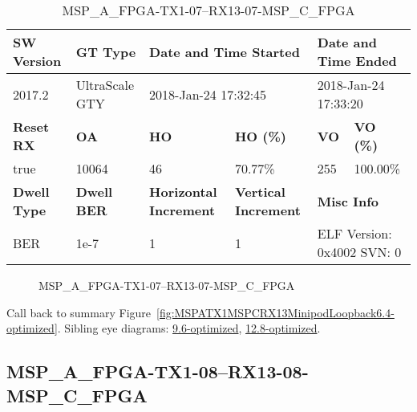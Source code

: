\begin{table}[h]
\centering
\caption{MSP\_A\_FPGA-TX1-07--RX13-07-MSP\_C\_FPGA}
\label{tab:MSPAFPGATX107RX1307MSPCFPGA6.4-optimized}
\begin{tabular}{@{}|l|l|l|l|l|l|@{}}
\toprule
\textbf{SW Version}                & \textbf{GT Type}   & \multicolumn{2}{l|}{\textbf{Date and Time Started}}            & \multicolumn{2}{l|}{\textbf{Date and Time Ended}}        \\ \midrule
2017.2                       & UltraScale GTY          & \multicolumn{2}{l|}{2018-Jan-24 17:32:45}                   & \multicolumn{2}{l|}{2018-Jan-24 17:33:20}               \\ \midrule
\textbf{Reset RX}                  & \textbf{OA} & \textbf{HO}   & \textbf{HO (\%)} & \textbf{VO} & \textbf{VO (\%)} \\ \midrule
true & 10064        & 46          & 70.77\%        & 255        & 100.00\%       \\ \midrule
\textbf{Dwell Type}                & \textbf{Dwell BER} & \textbf{Horizontal Increment} & \textbf{Vertical Increment}    & \multicolumn{2}{l|}{\textbf{Misc Info}}                  \\ \midrule
BER                            & 1e-7        & 1        & 1           & \multicolumn{2}{l|}{ELF Version: 0x4002 SVN: 0}                         \\ \bottomrule
\end{tabular}
\end{table}

\begin{figure}[h]
\caption{MSP\_A\_FPGA-TX1-07--RX13-07-MSP\_C\_FPGA} \label{fig:MSPAFPGATX107RX1307MSPCFPGA6.4-optimized}
\end{figure}

Call back to summary Figure~\ref{fig:MSPATX1MSPCRX13MinipodLoopback6.4-optimized}.
Sibling eye diagrams: \hyperref[sec:MSPAFPGATX107RX1307MSPCFPGA9.6-optimized]{9.6-optimized}, \hyperref[sec:MSPAFPGATX107RX1307MSPCFPGA12.8-optimized]{12.8-optimized}.

\clearpage
\newpage


\subsection{MSP\_A\_FPGA-TX1-08--RX13-08-MSP\_C\_FPGA}\label{sec:MSPAFPGATX108RX1308MSPCFPGA6.4-optimized}

